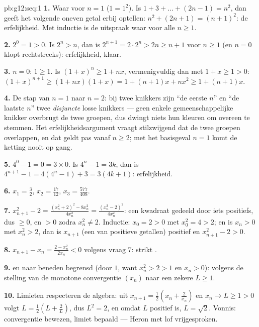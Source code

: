 \begin{solution}{pb:g12:seq:1}
\textbf{1.} Waar voor $n = 1$ ($1 = 1^2$). Is
$1 + 3 + \dots + (2n - 1) = n^2$, dan geeft het volgende oneven getal
erbij optellen: $n^2 + (2n + 1) = (n + 1)^2$: de erfelijkheid. Met inductie
is de uitspraak waar voor alle $n \geq 1$.

\textbf{2.} $2^0 = 1 > 0$. Is $2^n > n$, dan is
$2^{n+1} = 2 \cdot 2^n > 2n \geq n + 1$ voor $n \geq 1$ (en $n = 0$ klopt
rechtstreeks): erfelijkheid, klaar.

\textbf{3.} $n = 0$: $1 \geq 1$. Is $(1 + x)^n \geq 1 + nx$, vermenigvuldig
dan met $1 + x \geq 1 > 0$:
$(1 + x)^{n+1} \geq (1 + nx)(1 + x) = 1 + (n + 1)x + nx^2 \geq 1 + (n + 1)x$.

\textbf{4.} De stap van $n = 1$ naar $n = 2$: bij twee knikkers zijn ``de
eerste $n$'' en ``de laatste $n$'' twee \emph{disjuncte} losse knikkers ---
geen enkele gemeenschappelijke knikker overbrugt de twee groepen, dus dwingt
niets hun kleuren om overeen te stemmen. Het erfelijkheidsargument vraagt
stilzwijgend dat de twee groepen overlappen, en dat geldt pas vanaf
$n \geq 2$; met het basisgeval $n = 1$ komt de ketting nooit op gang.

\textbf{5.} $4^0 - 1 = 0 = 3 \times 0$. Is $4^n - 1 = 3k$, dan is
$4^{n+1} - 1 = 4(4^n - 1) + 3 = 3(4k + 1)$: erfelijkheid.

\textbf{6.} $x_1 = \frac32$, $x_2 = \frac{17}{12}$,
$x_3 = \frac{577}{408}$.

\textbf{7.} $x_{n+1}^2 - 2 = \frac{(x_n^2 + 2)^2 - 8x_n^2}{4x_n^2} =
\frac{(x_n^2 - 2)^2}{4 x_n^2}$: een kwadraat gedeeld door iets positiefs,
dus $\geq 0$, en $> 0$ zodra $x_n^2 \neq 2$. Inductie: $x_0 = 2 > 0$ met
$x_0^2 = 4 > 2$; en is $x_n > 0$ met $x_n^2 > 2$, dan is $x_{n+1}$ (een
 van positieve getallen) positief en $x_{n+1}^2 - 2 > 0$.

\textbf{8.} $x_{n+1} - x_n = \frac{2 - x_n^2}{2x_n} < 0$ volgens vraag 7:
strikt .

\textbf{9.}  en naar beneden begrensd (door $1$, want $x_n^2 > 2 > 1$
en $x_n > 0$): volgens de stelling van de monotone convergentie 
$(x_n)$ naar een zekere $L \geq 1$.

\textbf{10.} Limieten respecteren de algebra: uit
$x_{n+1} = \frac12\left(x_n + \frac{2}{x_n}\right)$ en
$x_n \to L \geq 1 > 0$ volgt $L = \frac12\left(L + \frac2L\right)$, dus
$L^2 = 2$, en omdat $L$ positief is, $L = \sqrt2$. Vonnis: convergentie
bewezen, limiet bepaald --- Heron met lof vrijgesproken.


\end{solution}
